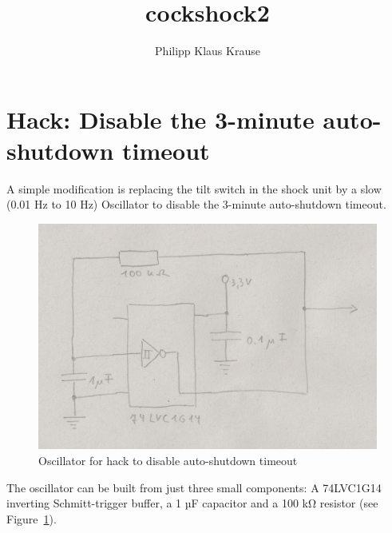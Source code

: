 \documentclass[a4paper]{article}
\begin{document}
\title{cockshock2}
\author{Philipp Klaus Krause}

\maketitle

\section{Hack: Disable the 3-minute auto-shutdown timeout}

A simple modification is replacing the tilt switch in the shock unit by a slow (0.01 Hz to 10 Hz) Oscillator to disable the 3-minute auto-shutdown timeout.

\begin{figure}
	\centerline{\includegraphics[scale=1.0]{auto-shutdown-timeout-hack.jpeg}}
	\caption{\label{auto-shutdown-timeout-hack}Oscillator for hack to disable auto-shutdown timeout}
\end{figure}

The oscillator can be built from just three small components: A 74LVC1G14 inverting Schmitt-trigger buffer, a 1 µF capacitor and a 100 k\si{\ohm} resistor (see Figure~\ref{auto-shutdown-timeout-hack}).
\end{document}
